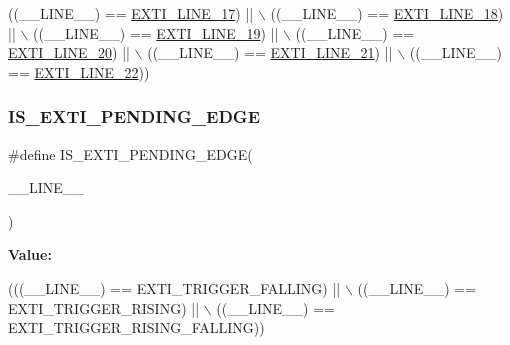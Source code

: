 \begin{DoxyCode}
                                 ((\_\_LINE\_\_) == \hyperlink{group___e_x_t_i___line_ga9d09e51fda52def20bd23a0c42da3014}{EXTI\_LINE\_17}) || \(\backslash\)
                                 ((\_\_LINE\_\_) == \hyperlink{group___e_x_t_i___line_ga8f420801658edbe81973c670ed97913e}{EXTI\_LINE\_18}) || \(\backslash\)
                                 ((\_\_LINE\_\_) == \hyperlink{group___e_x_t_i___line_gaa69d86266839e0980ad222192760c760}{EXTI\_LINE\_19}) || \(\backslash\)
                                 ((\_\_LINE\_\_) == \hyperlink{group___e_x_t_i___line_ga1d35577fb74cdbf58431570bd763f615}{EXTI\_LINE\_20}) || \(\backslash\)
                                 ((\_\_LINE\_\_) == \hyperlink{group___e_x_t_i___line_gaae9d458581e656ab574d6d56b9844587}{EXTI\_LINE\_21}) || \(\backslash\)
                                 ((\_\_LINE\_\_) == \hyperlink{group___e_x_t_i___line_gacf5c5aed8ca5e9a3a3128d314cbe1f7f}{EXTI\_LINE\_22}))
\end{DoxyCode}
\mbox{\label{group___e_x_t_i___private___macros_ga11d59f58f3608c79dc729205e6421e93}} 
\subsubsection{\texorpdfstring{I\+S\+\_\+\+E\+X\+T\+I\+\_\+\+P\+E\+N\+D\+I\+N\+G\+\_\+\+E\+D\+GE}{IS\_EXTI\_PENDING\_EDGE}}
{\footnotesize\ttfamily \#define I\+S\+\_\+\+E\+X\+T\+I\+\_\+\+P\+E\+N\+D\+I\+N\+G\+\_\+\+E\+D\+GE(\begin{DoxyParamCaption}\item[{}]{\+\_\+\+\_\+\+L\+I\+N\+E\+\_\+\+\_\+ }\end{DoxyParamCaption})}

{\bfseries Value\+:}
\begin{DoxyCode}
(((\_\_LINE\_\_) == EXTI\_TRIGGER\_FALLING) || \(\backslash\)
                                         ((\_\_LINE\_\_) == EXTI\_TRIGGER\_RISING) || \(\backslash\)
                                         ((\_\_LINE\_\_) == EXTI\_TRIGGER\_RISING\_FALLING))
\end{DoxyCode}
